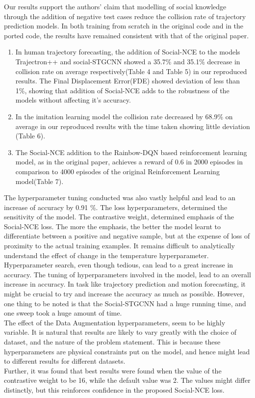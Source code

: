 {Our results support the authors' claim that modelling of social knowledge through the addition of negative test cases reduce the collision rate of trajectory prediction models. In both training from scratch in the original code and in the ported code, the results have remained consistent with that of the original paper. 
\begin{enumerate}
  \item In human trajectory forecasting, the addition of Social-NCE to the models Trajectron++ and social-STGCNN showed a 35.7\% and 35.1\% decrease in collision rate on average respectively(Table 4 and Table 5) in our reproduced results. The Final Displacement Error(FDE) showed deviation of less than 1\%, showing that addition of Social-NCE adds to the robustness of the models without affecting it's accuracy.
  \item In the imitation learning model the collision rate decreased by 68.9\% on average in our reproduced results with the time taken showing little deviation (Table 6). 
  \item The Social-NCE addition to the Rainbow-DQN based reinforcement learning model, as in the original paper, achieves a reward of 0.6 in 2000 episodes in comparison to 4000 episodes of the original Reinforcement Learning model(Table 7).
\end{enumerate}
The hyperparameter tuning conducted was also vastly helpful and lead to an increase of accuracy by 0.91 \%. The loss hyperparameters, determined the sensitivity of the model. The contrastive weight, determined emphasis of the Social-NCE loss. The more the emphasis, the better the model learnt to differentiate between a positive and negative sample, but at the expense of loss of proximity to the actual training examples. It remains difficult to analytically understand the effect of change in the temperature hyperparameter.\\
Hyperparameter search, even though tedious, can lead to a great increase in accuracy. The tuning of hyperparameters involved in the model, lead to an overall increase in accuracy. In task like trajectory prediction and motion forecasting, it might be crucial to try and increase the accuracy as much as possible. However, one thing to be noted is that the Social-STGCNN had a huge running time, and one sweep took a huge amount of time.\\
The effect of the Data Augmentation hyperparameters, seem to be highly variable. It is natural that results are likely to vary greatly with the choice of dataset, and the nature of the problem statement. This is because these hyperparameters are physical constraints put on the model, and hence might lead to different results for different datasets.\\
Further, it was found that best results were found when the value of the contrastive weight to be 16, while the default value was 2. The values might differ distinctly, but this reinforces confidence in the proposed Social-NCE loss. 
}
